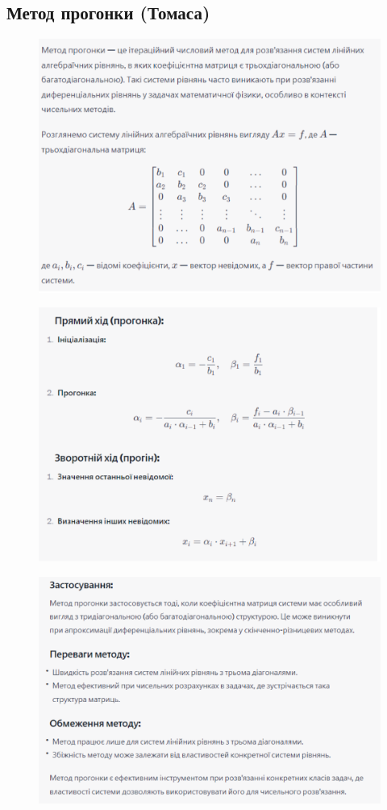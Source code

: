 \documentclass[a4paper, 12pt]{article}
\begin{document}
\clearpage
\newpage
\subsection{Метод прогонки (Томаса)}

\begin{figure}[ht]
	\centering
	\includegraphics[width=0.75\linewidth]{progonka1.png}
\end{figure}
\begin{figure}[ht]
	\centering
	\includegraphics[width=0.75\linewidth]{progonka2.png}
\end{figure}
\begin{figure}[ht]
	\centering
	\includegraphics[width=0.75\linewidth]{progonka3.png}
\end{figure}
\end{document}
